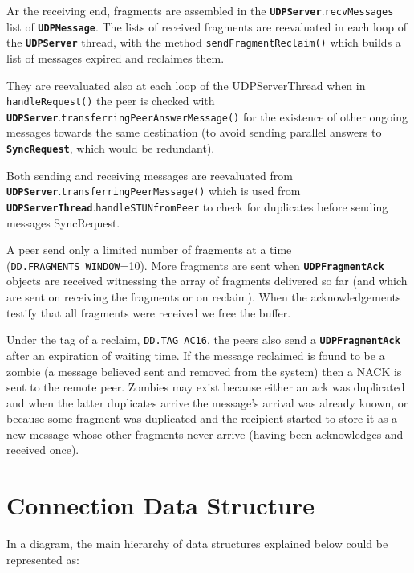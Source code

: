 \documentclass{book}
\newcommand{\cls}[1]{{\tt\bf #1}}
\newcommand{\mth}[1]{{\tt #1}}
\newcommand{\mmb}[1]{{\tt #1}}
\begin{document}
Ar the receiving end, fragments are assembled in the \cls{UDPServer}.\mth{recvMessages} list of \cls{UDPMessage}.
The lists of received fragments are reevaluated in each loop of the \cls{UDPServer} thread, with the method \mth{sendFragmentReclaim()}
which builds a list of messages expired and reclaimes them. 

They are reevaluated also at each loop of the UDPServerThread when  in \mth{handleRequest()}
the peer is checked with \cls{UDPServer}.\mth{transferringPeerAnswerMessage()} for the existence of other ongoing messages towards the same destination (to avoid sending parallel answers to \cls{SyncRequest}, which would be redundant).

Both sending and receiving messages are reevaluated from \cls{UDPServer}.\mth{transferringPeerMessage()}
which is used from \cls{UDPServerThread}.\mth{handleSTUNfromPeer} to check for duplicates before sending messages SyncRequest.

A peer send only a limited number of fragments at a time (\mmb{DD.FRAGMENTS\_WINDOW}=10).
More fragments are sent when \cls{UDPFragmentAck} objects are received witnessing the array of fragments delivered
so far (and which are sent on receiving the fragments or on reclaim).
When the acknowledgements testify that all fragments were received we free the buffer.

Under the tag of a reclaim, \mmb{DD.TAG\_AC16}, the peers also send a  \cls{UDPFragmentAck} after an expiration of waiting time.
If the message reclaimed is found to be a zombie (a message believed sent and removed from the system) then a NACK is sent
to the remote peer. Zombies may exist because either an ack was duplicated and when the latter duplicates arrive the message's
arrival was already known, or because some fragment was duplicated and the recipient started to store it as a new message
whose other fragments never arrive (having been acknowledges and received once).

\chapter{Connection Data Structure}

In a diagram, the main hierarchy of data structures explained below could be represented as:
\end{document}
